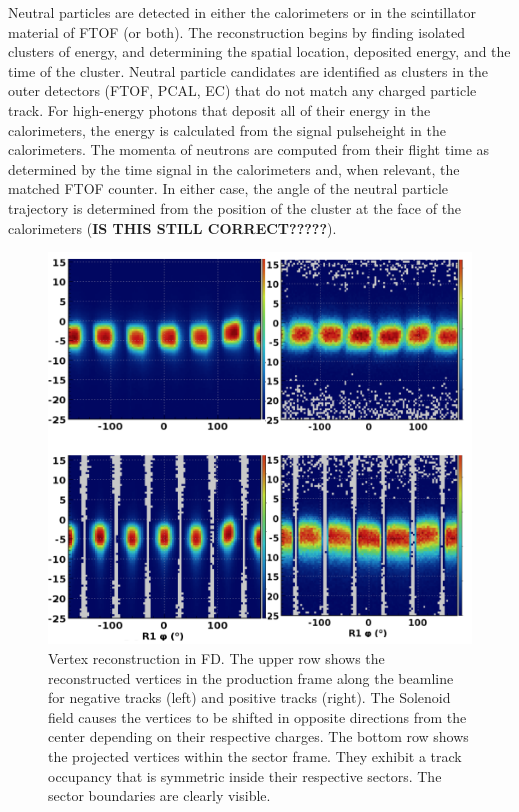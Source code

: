 \documentclass[final,3p,twocolumn]{elsarticle}
\begin{document}
Neutral particles are detected in either the calorimeters or in the scintillator material of FTOF (or both). The 
reconstruction begins by finding isolated clusters of energy, and determining the spatial location, deposited 
energy, and the time of the cluster. Neutral particle candidates are identified as clusters in the outer detectors 
(FTOF, PCAL, EC) that do not match any charged particle track. For high-energy photons that deposit all of their 
energy in the calorimeters, the energy is calculated from the signal pulseheight in the calorimeters. The momenta 
of neutrons are computed from their flight time as determined by the time signal in the calorimeters and, 
when relevant, the matched FTOF counter. In either case, the angle of the neutral particle trajectory is determined
from the position of the cluster at the face of the calorimeters ({\bf IS THIS STILL CORRECT?????}).  
\begin{figure}[htbp!]
\centerline {
\includegraphics[width=0.96\columnwidth]{tracking_vertices.png}}
\caption{Vertex reconstruction in FD. The upper row shows the reconstructed vertices in the production frame along the beamline for negative tracks (left) and positive tracks (right). The Solenoid field causes the vertices to be shifted in opposite directions from the center depending on their respective charges. The bottom row shows the projected vertices within the sector frame. They exhibit a track occupancy that is symmetric inside their respective sectors. The sector boundaries are clearly visible.} 
\label{vertex}
\end{figure}
\end{document}
